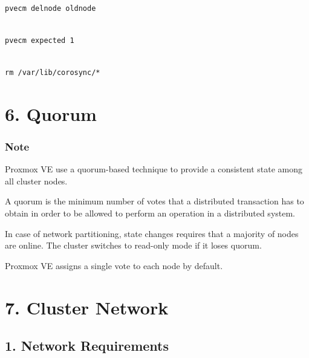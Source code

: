 \begin{lstlisting}

pvecm delnode oldnode

\end{lstlisting}

\begin{lstlisting}

pvecm expected 1

\end{lstlisting}

\begin{lstlisting}

rm /var/lib/corosync/*

\end{lstlisting}


\section{6. Quorum}

\subsubsection{Note}

Proxmox VE use a quorum-based technique to provide a consistent state among all cluster nodes.

A quorum is the minimum number of votes that a distributed transaction has to obtain in order to be allowed to perform an operation in a distributed system.

In case of network partitioning, state changes requires that a majority of nodes are online. The cluster switches to read-only mode if it loses quorum.

Proxmox VE assigns a single vote to each node by default.

\begin{table}[htbp]

\centering

\begin{tabular}

\end{tabular}

\end{table}


\section{7. Cluster Network}

\subsection{1. Network Requirements}

